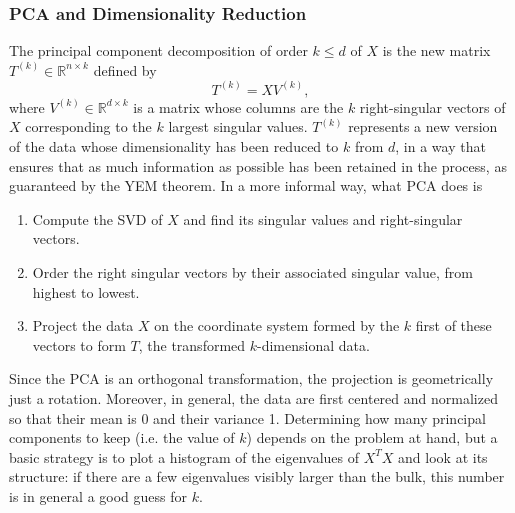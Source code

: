 \documentclass{article}
\begin{document}
\subsubsection*{PCA and Dimensionality Reduction}
The principal component decomposition of order $k\leq d$ of $X$ is the new matrix $T^{(k)} \in \mathbb{R}^{n\times k}$ defined by
\begin{equation}
    T^{(k)} = XV^{(k)},
\end{equation}
where $V^{(k)} \in \mathbb{R}^{d\times k}$ is a matrix whose columns are the $k$ right-singular vectors of $X$ corresponding to the $k$ largest singular values. $T^{(k)}$ represents a new version of the data whose dimensionality has been reduced to $k$ from $d$, in a way that ensures that as much information as possible has been retained in the process, as guaranteed by the YEM theorem. In a more informal way, what PCA does is
\begin{enumerate}
    \item Compute the SVD of $X$ and find its singular values and right-singular vectors.
    \item Order the right singular vectors by their associated singular value, from highest to lowest.
    \item Project the data $X$ on the coordinate system formed by the $k$ first of these vectors to form $T$, the transformed $k$-dimensional data.
\end{enumerate}
Since the PCA is an orthogonal transformation, the projection is geometrically just a rotation. Moreover, in general, the data are first centered and normalized so that their mean is 0 and their variance 1. Determining how many principal components to keep (i.e. the value of $k$) depends on the problem at hand, but a basic strategy is to plot a histogram of the eigenvalues of $X^TX$ and look at its structure: if there are a few eigenvalues visibly larger than the bulk, this number is in general a good guess for $k$.
\end{document}
